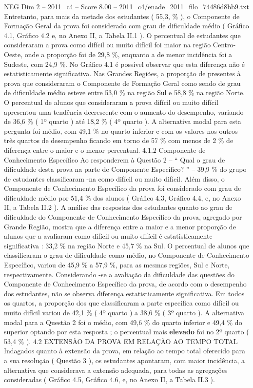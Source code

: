\begin{textsample}{NEG Dim 2 – 2011\_c4 – Score 8.00 – 2011\_c4/enade\_2011\_filo\_74486d8bb9.txt}
Entretanto, para mais da metade dos estudantes ( 55,3, \% ), o Componente de Formação Geral da prova foi considerado com grau de dificuldade médio ( Gráfico 4.1, Gráfico 4.2 e, no Anexo II, a Tabela II.1 ).
O percentual de estudantes que consideraram a prova como difícil ou muito difícil foi maior na região Centro-Oeste, onde a proporção foi de 29,8 \%, enquanto a de menor incidência foi a Sudeste, com 24,9 \%.
No Gráfico 4.1 é possível observar que esta diferença não é estatisticamente significativa.
Nas Grandes Regiões, a proporção de presentes à prova que consideraram o Componente de Formação Geral como sendo de grau de dificuldade médio esteve entre 53,0 \% na região Sul e 58,8 \% na região Norte.
O percentual de alunos que consideraram a prova difícil ou muito difícil apresentou uma tendência decrescente com o aumento do desempenho, variando de 36,6 \% ( 1º quarto ) até 18,2 \% ( 4º quarto ).
A alternativa modal para esta pergunta foi médio, com 49,1 \% no quarto inferior e com os valores nos outros três quartos de desempenho ficando em torno de 57 \% com menos de 2 \% de diferença entre o maior e o menor percentual. 4.1.2 Componente de Conhecimento Específico Ao responderem à Questão 2 – “ Qual o grau de dificuldade desta prova na parte de Componente Específico? ” – 39,9 \% do grupo de estudantes classificaram -na como difícil ou muito difícil.
Além disso, o Componente de Conhecimento Específico da prova foi considerado com grau de dificuldade médio por 51,4 \% dos alunos ( Gráfico 4.3, Gráfico 4.4, e, no Anexo II, a Tabela II.2 ).
A análise das respostas dos estudantes quanto ao grau de dificuldade do Componente de Conhecimento Específico da prova, agregado por Grande Região, mostra que a diferença entre a maior e a menor proporção de alunos que a avaliaram como difícil ou muito difícil é estatisticamente significativa : 33,2 \% na região Norte e 45,7 \% na Sul.
O percentual de alunos que classificaram o grau de dificuldade como médio, no Componente de Conhecimento Específico, variou de 45,9 \% a 57,9 \%, para as mesmas regiões, Sul e Norte, respectivamente.
Considerando -se a avaliação da dificuldade das questões do Componente de Conhecimento Específico da prova, de acordo com o desempenho dos estudantes, não se observa diferença estatisticamente significativa.
Em todos os quartos, a proporção dos que classificaram a parte específica como difícil ou muito difícil variou de 42,1 \% ( 4º quarto ) a 38,6 \% ( 3º quarto ).
A alternativa modal para a Questão 2 foi o médio, com 49,6 \% do quarto inferior e 49,4 \% do superior optando por esta resposta ; o percentual mais \textbf{elevado} foi no 2º quarto ( 53,4 \% ). 4.2 EXTENSÃO DA PROVA EM RELAÇÃO AO TEMPO TOTAL Indagados quanto à extensão da prova, em relação ao tempo total oferecido para a sua resolução ( Questão 3 ), os estudantes apontaram, com maior incidência, a alternativa que considerava a extensão adequada, para todas as agregações consideradas ( Gráfico 4.5, Gráfico 4.6, e, no Anexo II, a Tabela II.3 ).

\end{textsample}
